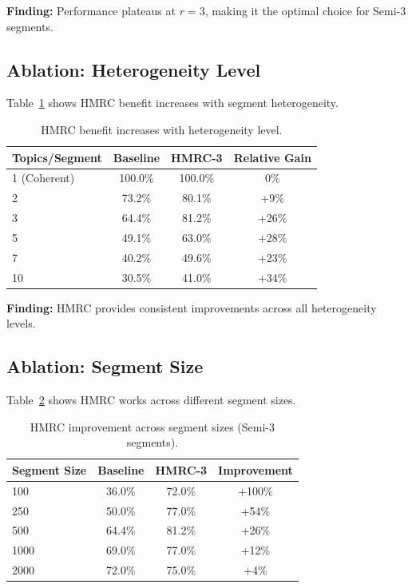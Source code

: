 \documentclass[sigconf, nonacm]{acmart}
\begin{document}
\textbf{Finding:} Performance plateaus at $r=3$, making it the optimal choice for Semi-3 segments.

\subsection{Ablation: Heterogeneity Level}

Table~\ref{tab:topics} shows HMRC benefit increases with segment heterogeneity.

\begin{table}[h]
\caption{HMRC benefit increases with heterogeneity level.}
\label{tab:topics}
\begin{tabular}{lccc}
\toprule
\textbf{Topics/Segment} & \textbf{Baseline} & \textbf{HMRC-3} & \textbf{Relative Gain} \\
\midrule
1 (Coherent) & 100.0\% & 100.0\% & 0\% \\
2 & 73.2\% & 80.1\% & +9\% \\
3 & 64.4\% & 81.2\% & +26\% \\
5 & 49.1\% & 63.0\% & +28\% \\
7 & 40.2\% & 49.6\% & +23\% \\
10 & 30.5\% & 41.0\% & +34\% \\
\bottomrule
\end{tabular}
\end{table}

\textbf{Finding:} HMRC provides consistent improvements across all heterogeneity levels.

\subsection{Ablation: Segment Size}

Table~\ref{tab:sizes} shows HMRC works across different segment sizes.

\begin{table}[h]
\caption{HMRC improvement across segment sizes (Semi-3 segments).}
\label{tab:sizes}
\begin{tabular}{lccc}
\toprule
\textbf{Segment Size} & \textbf{Baseline} & \textbf{HMRC-3} & \textbf{Improvement} \\
\midrule
100 & 36.0\% & 72.0\% & +100\% \\
250 & 50.0\% & 77.0\% & +54\% \\
500 & 64.4\% & 81.2\% & +26\% \\
1000 & 69.0\% & 77.0\% & +12\% \\
2000 & 72.0\% & 75.0\% & +4\% \\
\bottomrule
\end{tabular}
\end{table}
\end{document}
